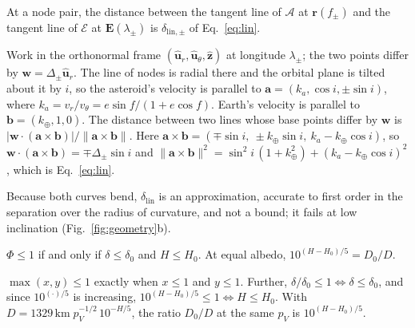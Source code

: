 \begin{lemma}\label{lem:lin}
At a node pair, the distance between the tangent line of $\mathcal{A}$ at $\mathbf{r}(f_\pm)$ and the tangent line of $\mathcal{E}$ at $\mathbf{E}(\lambda_\pm)$ is $\delta_{\mathrm{lin},\pm}$ of Eq.~\eqref{eq:lin}.
\end{lemma}
\begin{IEEEproof}
Work in the orthonormal frame $(\hat{\mathbf{u}}_r, \hat{\mathbf{u}}_\theta, \hat{\mathbf{z}})$ at longitude $\lambda_\pm$; the two points differ by $\mathbf{w} = \Delta_\pm\hat{\mathbf{u}}_r$. The line of nodes is radial there and the orbital plane is tilted about it by $i$, so the asteroid's velocity is parallel to $\mathbf{a} = (k_a, \cos i, \pm\sin i)$, where $k_a = v_r/v_\theta = e\sin f/(1 + e\cos f)$. Earth's velocity is parallel to $\mathbf{b} = (k_\oplus, 1, 0)$. The distance between two lines whose base points differ by $\mathbf{w}$ is $|\mathbf{w}\cdot(\mathbf{a}\times\mathbf{b})|/\lVert\mathbf{a}\times\mathbf{b}\rVert$. Here $\mathbf{a}\times\mathbf{b} = (\mp\sin i,\ \pm k_\oplus\sin i,\ k_a - k_\oplus\cos i)$, so $\mathbf{w}\cdot(\mathbf{a}\times\mathbf{b}) = \mp\Delta_\pm\sin i$ and $\lVert\mathbf{a}\times\mathbf{b}\rVert^2 = \sin^2 i\,(1 + k_\oplus^2) + (k_a - k_\oplus\cos i)^2$, which is Eq.~\eqref{eq:lin}.
\end{IEEEproof}
Because both curves bend, $\delta_{\mathrm{lin}}$ is an approximation, accurate to first order in the separation over the radius of curvature, and not a bound; it fails at low inclination (Fig.~\ref{fig:geometry}b).

\begin{proposition}\label{prop:phi}
$\Phi \le 1$ if and only if $\delta \le \delta_0$ and $H \le H_0$. At equal albedo, $10^{(H - H_0)/5} = D_0/D$.
\end{proposition}
\begin{IEEEproof}
$\max(x, y) \le 1$ exactly when $x \le 1$ and $y \le 1$. Further, $\delta/\delta_0 \le 1 \Leftrightarrow \delta \le \delta_0$, and since $10^{(\cdot)/5}$ is increasing, $10^{(H - H_0)/5} \le 1 \Leftrightarrow H \le H_0$. With $D = 1329\,\mathrm{km}\;p_V^{-1/2}\,10^{-H/5}$, the ratio $D_0/D$ at the same $p_V$ is $10^{(H - H_0)/5}$.
\end{IEEEproof}

